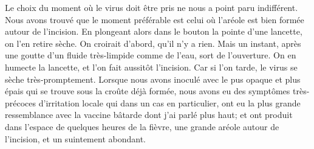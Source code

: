 \setcounter{page}{79}
Le choix du moment où le virus doit être pris ne nous a point paru indifférent. Nous avons trouvé que le moment préférable est celui où l'aréole est bien formée autour de l'incision. En plongeant alors dans le bouton la pointe d'une lancette, on l'en retire sèche. On croirait d'abord, qu'il n'y a rien. Mais un instant, après une goutte d'un fluide très-limpide comme de l'eau, sort de l'ouverture. On en humecte la lancette, et l'on fait aussitôt l'incision. Car si l'on tarde, le virus se sèche très-promptement.
Lorsque nous avons inoculé avec le pus opaque et plus épais qui se trouve sous la croûte déjà formée, nous avons eu des symptômes très-précoces d'irritation locale qui dans un cas en particulier, ont eu la plus grande ressemblance avec la vaccine bâtarde dont j'ai parlé plus haut; et ont produit dans l'espace de quelques heures de la fièvre, une grande aréole autour de l'incision, et un suintement abondant.


